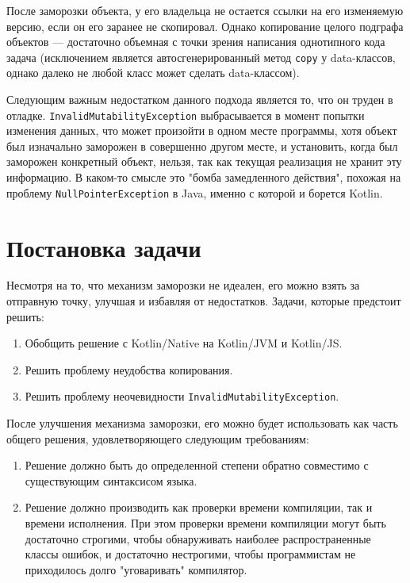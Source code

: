 \documentclass[specification,annotation,times]{itmo-student-thesis}
\begin{document}
После заморозки объекта, у его владельца не остается ссылки на его изменяемую версию, если он его заранее не скопировал.
Однако копирование целого подграфа объектов –-- достаточно объемная с точки зрения написания однотипного кода задача (исключением является автосгенерированный метод \texttt{copy} у data-классов, однако далеко не любой класс может сделать data-классом).

Следующим важным недостатком данного подхода является то, что он труден в отладке.
\texttt{InvalidMutabilityException} выбрасывается в момент попытки изменения данных, что может произойти в одном месте программы, хотя объект был изначально заморожен в совершенно другом месте, и установить, когда был заморожен конкретный объект, нельзя, так как текущая реализация не хранит эту информацию.
В каком-то смысле это "бомба замедленного действия", похожая на проблему \texttt{NullPointerException} в Java, именно с которой и борется Kotlin.

\section{Постановка задачи}

Несмотря на то, что механизм заморозки не идеален, его можно взять за отправную точку, улучшая и избавляя от недостатков. Задачи, которые предстоит решить:

\begin{enumerate}
	\item Обобщить решение с Kotlin/Native на Kotlin/JVM и Kotlin/JS.
	\item Решить проблему неудобства копирования.
	\item Решить проблему неочевидности \texttt{InvalidMutabilityException}.
\end{enumerate}

После улучшения механизма заморозки, его можно будет использовать как часть общего решения, удовлетворяющего следующим требованиям:

\begin{enumerate}
	\item Решение должно быть до определенной степени обратно совместимо с существующим синтаксисом языка.
	\item Решение должно производить как проверки времени компиляции, так и времени исполнения. При этом проверки времени компиляции могут быть достаточно строгими, чтобы обнаруживать наиболее распространенные классы ошибок, и достаточно нестрогими, чтобы программистам не приходилось долго "уговаривать" компилятор.
\end{enumerate}
\end{document}
